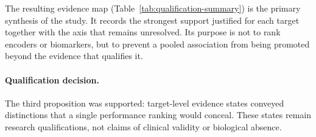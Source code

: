 The resulting evidence map (Table~\ref{tab:qualification-summary}) is the primary synthesis
of the study. It records the strongest support justified for each target together with the
axis that remains unresolved. Its purpose is not to rank encoders or biomarkers, but to
prevent a pooled association from being promoted beyond the evidence that qualifies it.

\paragraph{Qualification decision.}
The third proposition was supported: target-level evidence states conveyed distinctions
that a single performance ranking would conceal. These states remain research
qualifications, not claims of clinical validity or biological absence.


